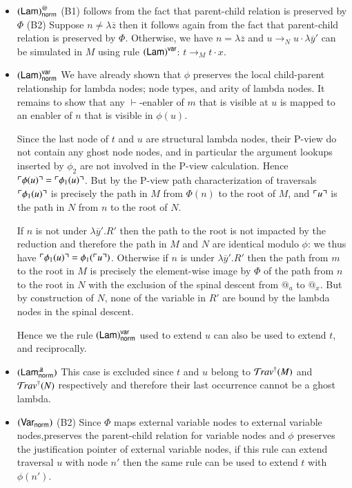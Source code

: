\documentclass{elsarticle}
\theoremstyle{plain}
\theoremstyle{definition}
\theoremstyle{remark}
\newcommand{\ghostlmd}{{\lambda\!\!\lambda}}
\newcommand{\normalizing}{{\sf norm}}
\newcommand{\enables}{\vdash} %
\begin{document}
\begin{description}[itemindent=0em,leftmargin=0cm]
\begin{itemize}[itemindent=0.5em, leftmargin=0.5em]
    \item $\rulename{Lam}^@_\normalizing$
    (B1) follows from the fact that parent-child relation is preserved by $\Phi$
    (B2) Suppose $n \neq \lambda\overline{z}$ then it follows again from the fact that parent-child relation is preserved by $\Phi$.
    Otherwise, we have $n = \lambda\overline{z}$ and $u \rightarrow_N u \cdot \lambda\overline{y}'$ can be simulated in $M$ using rule $\mathbf{({\sf Lam})}^{\sf var}$: $t \rightarrow_M t \cdot x$.

    \item $\rulename{Lam}^{\sf var}_\normalizing$
    We have already shown that  $\phi$ preserves the local child-parent relationship for lambda nodes; node types, and arity of lambda nodes.
    It remains to show that any $\enables$-enabler of $m$ that is visible at  $u$ is mapped to an enabler of $n$ that is visible in $\phi(u)$.

    Since the last node of $t$ and $u$ are structural lambda nodes, their P-view do not contain any ghost node nodes, and in particular the argument lookups inserted by $\phi_2$ are not involved in the P-view calculation. Hence $\ulcorner \phi(u) \urcorner = \ulcorner \phi_1(u) \urcorner$.
    But by the P-view path characterization of traversals $\ulcorner \phi_1(u) \urcorner$ is precisely the path in $M$ from $\Phi(n)$ to the root of $M$,
    and $\ulcorner u \urcorner$ is the path in $N$ from $n$ to the root of $N$.

    If $n$ is not under $\lambda\overline{y}'.R'$ then the path to the root is not impacted by the reduction and therefore the path in $M$ and $N$ are identical modulo $\phi$: we thus have $\ulcorner \phi_1(u) \urcorner = \phi_1(\ulcorner u \urcorner)$.
    Otherwise if $n$ is under $\lambda\overline{y}'.R'$ then the path from $m$ to the root in $M$ is precisely the element-wise image by $\Phi$ of the path from $n$ to the root in $N$ with the exclusion of the spinal descent from $@_a$ to $@_x$. But by construction of $N$, none of the variable in $R'$ are bound by the lambda nodes in the spinal descent.

    Hence we the rule $\rulename{Lam}^{\sf var}_\normalizing$ used to extend  $u$ can also be used to extend $t$, and reciprocally.

    \item $\rulename{Lam^\ghostlmd_\normalizing}$
    This case is excluded since $t$ and $u$ belong to $\mathcal{T}\!rav^\dagger(M)$ and
    $\mathcal{T}\!rav^\dagger(N)$ respectively and therefore their last occurrence cannot be a ghost lambda.

    \item $\rulename{Var_\normalizing}$
    (B2) Since $\Phi$ maps external variable nodes to external variable nodes,preserves the parent-child relation for variable nodes and $\phi$ preserves the justification pointer of external variable nodes, if this rule can extend traversal $u$ with node $n'$ then the same rule can be used to extend $t$ with $\phi(n')$.


\end{itemize}
\end{description}
\end{document}
